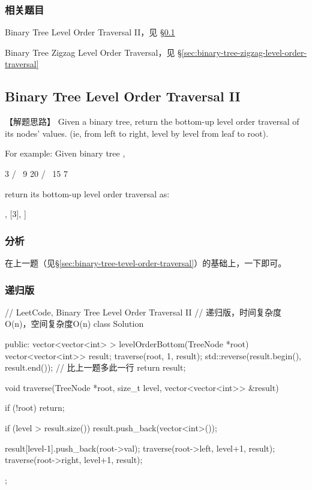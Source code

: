 \subsubsection{相关题目}
\begindot
\item Binary Tree Level Order Traversal II，见 \S \ref{sec:binary-tree-tevel-order-traversal-ii}
\item Binary Tree Zigzag Level Order Traversal，见 \S \ref{sec:binary-tree-zigzag-level-order-traversal}
\myenddot


\subsection{Binary Tree Level Order Traversal II}
\label{sec:binary-tree-tevel-order-traversal-ii}


【解题思路】
Given a binary tree, return the bottom-up level order traversal of its nodes' values. (ie, from left to right, level by level from leaf to root).

For example:
Given binary tree ,
\begin{Code}
	3
	/ \
	9  20
	/  \
	15   7
\end{Code}
return its bottom-up level order traversal as:
\begin{Code}
	[
	[15,7]
	[9,20],
	[3],
	]
\end{Code}


\subsubsection{分析}
在上一题（见\S \ref{sec:binary-tree-tevel-order-traversal}）的基础上，一下即可。


\subsubsection{递归版}
\begin{Code}
	// LeetCode, Binary Tree Level Order Traversal II
	// 递归版，时间复杂度O(n)，空间复杂度O(n)
	class Solution {
		public:
		vector<vector<int> > levelOrderBottom(TreeNode *root) {
			vector<vector<int>> result;
			traverse(root, 1, result);
			std::reverse(result.begin(), result.end()); // 比上一题多此一行
			return result;
		}
		
		void traverse(TreeNode *root, size_t level, vector<vector<int>> &result) {
			if (!root) return;
			
			if (level > result.size())
			result.push_back(vector<int>());
			
			result[level-1].push_back(root->val);
			traverse(root->left, level+1, result);
			traverse(root->right, level+1, result);
		}
	};
\end{Code}


